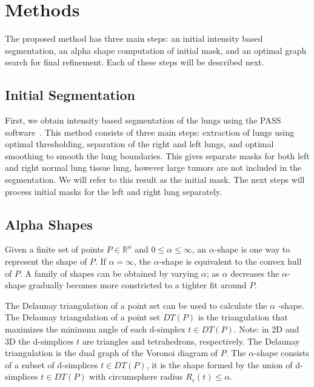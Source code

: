 \documentclass{llncs}
\begin{document}
%
\section{Methods}
%
The proposed method has three main steps: an initial intensity based segmentation, an alpha shape computation of initial mask, and an optimal graph search for final refinement. Each of these steps will be described next.
%
\subsection{Initial Segmentation}
%

First, we obtain intensity based segmentation of the lungs using the PASS software~\cite{guo2008}. This method consists of three main steps: extraction of lungs using optimal thresholding, separation of the right and left lungs, and optimal smoothing to smooth the lung boundaries. This gives separate masks for both left and right normal lung tissue lung, however large tumors are not included in the segmentation. We will refer to this result as the initial mask. The next steps will process initial masks for the left and right lung separately. 
%
\subsection{Alpha Shapes}
%
 Given a finite set of points $P \in \mathbb{R}^n$ and $ 0 \leq \alpha \leq \infty $, an $\alpha$-shape is one way to represent the shape of $P$. If $\alpha = \infty$, the $\alpha$-shape is equivalent to the convex hull of $P$. A family of shapes can be obtained by varying $\alpha$; as $\alpha$ decreases the $\alpha$-shape gradually becomes more constricted to a tighter fit around $P$.

The Delaunay triangulation of a point set can be used to calculate the $\alpha$ -shape.  The Delaunay triangulation of a point set $DT(P)$ is the triangulation that maximizes the minimum angle of each d-simplex $t \in DT(P)$. Note: in 2D and 3D the d-simplices $t$ are triangles and tetrahedrons, respectively. The Delaunay triangulation is the dual graph of the Voronoi diagram of $P$. The $\alpha$-shape consists of a subset of d-simplices $t \in DT(P)$, it is the shape formed by the union of d-simplices $t \in DT(P)$ with circumsphere radius $R_c(t) \leq \alpha$. 
\end{document}
